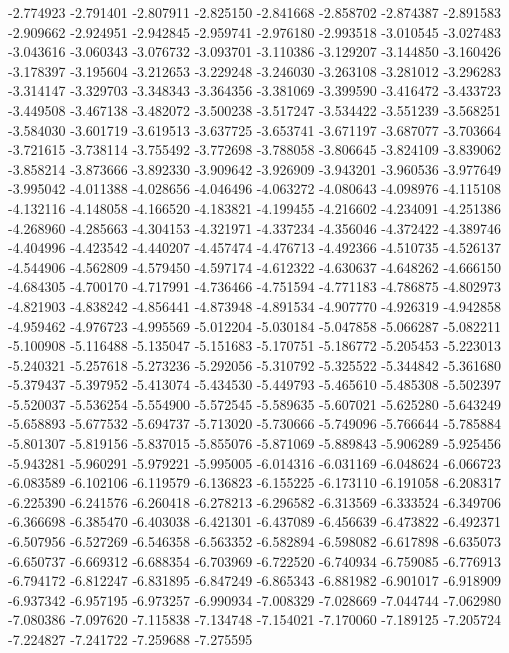 -2.774923
-2.791401
-2.807911
-2.825150
-2.841668
-2.858702
-2.874387
-2.891583
-2.909662
-2.924951
-2.942845
-2.959741
-2.976180
-2.993518
-3.010545
-3.027483
-3.043616
-3.060343
-3.076732
-3.093701
-3.110386
-3.129207
-3.144850
-3.160426
-3.178397
-3.195604
-3.212653
-3.229248
-3.246030
-3.263108
-3.281012
-3.296283
-3.314147
-3.329703
-3.348343
-3.364356
-3.381069
-3.399590
-3.416472
-3.433723
-3.449508
-3.467138
-3.482072
-3.500238
-3.517247
-3.534422
-3.551239
-3.568251
-3.584030
-3.601719
-3.619513
-3.637725
-3.653741
-3.671197
-3.687077
-3.703664
-3.721615
-3.738114
-3.755492
-3.772698
-3.788058
-3.806645
-3.824109
-3.839062
-3.858214
-3.873666
-3.892330
-3.909642
-3.926909
-3.943201
-3.960536
-3.977649
-3.995042
-4.011388
-4.028656
-4.046496
-4.063272
-4.080643
-4.098976
-4.115108
-4.132116
-4.148058
-4.166520
-4.183821
-4.199455
-4.216602
-4.234091
-4.251386
-4.268960
-4.285663
-4.304153
-4.321971
-4.337234
-4.356046
-4.372422
-4.389746
-4.404996
-4.423542
-4.440207
-4.457474
-4.476713
-4.492366
-4.510735
-4.526137
-4.544906
-4.562809
-4.579450
-4.597174
-4.612322
-4.630637
-4.648262
-4.666150
-4.684305
-4.700170
-4.717991
-4.736466
-4.751594
-4.771183
-4.786875
-4.802973
-4.821903
-4.838242
-4.856441
-4.873948
-4.891534
-4.907770
-4.926319
-4.942858
-4.959462
-4.976723
-4.995569
-5.012204
-5.030184
-5.047858
-5.066287
-5.082211
-5.100908
-5.116488
-5.135047
-5.151683
-5.170751
-5.186772
-5.205453
-5.223013
-5.240321
-5.257618
-5.273236
-5.292056
-5.310792
-5.325522
-5.344842
-5.361680
-5.379437
-5.397952
-5.413074
-5.434530
-5.449793
-5.465610
-5.485308
-5.502397
-5.520037
-5.536254
-5.554900
-5.572545
-5.589635
-5.607021
-5.625280
-5.643249
-5.658893
-5.677532
-5.694737
-5.713020
-5.730666
-5.749096
-5.766644
-5.785884
-5.801307
-5.819156
-5.837015
-5.855076
-5.871069
-5.889843
-5.906289
-5.925456
-5.943281
-5.960291
-5.979221
-5.995005
-6.014316
-6.031169
-6.048624
-6.066723
-6.083589
-6.102106
-6.119579
-6.136823
-6.155225
-6.173110
-6.191058
-6.208317
-6.225390
-6.241576
-6.260418
-6.278213
-6.296582
-6.313569
-6.333524
-6.349706
-6.366698
-6.385470
-6.403038
-6.421301
-6.437089
-6.456639
-6.473822
-6.492371
-6.507956
-6.527269
-6.546358
-6.563352
-6.582894
-6.598082
-6.617898
-6.635073
-6.650737
-6.669312
-6.688354
-6.703969
-6.722520
-6.740934
-6.759085
-6.776913
-6.794172
-6.812247
-6.831895
-6.847249
-6.865343
-6.881982
-6.901017
-6.918909
-6.937342
-6.957195
-6.973257
-6.990934
-7.008329
-7.028669
-7.044744
-7.062980
-7.080386
-7.097620
-7.115838
-7.134748
-7.154021
-7.170060
-7.189125
-7.205724
-7.224827
-7.241722
-7.259688
-7.275595
